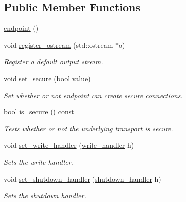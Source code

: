 \subsection*{Public Member Functions}
\begin{DoxyCompactItemize}
\item 
\hyperlink{classwebsocketpp_1_1transport_1_1iostream_1_1endpoint_a411c3b6ac387cef649e0925a7747c9d3}{endpoint} ()
\item 
void \hyperlink{classwebsocketpp_1_1transport_1_1iostream_1_1endpoint_ad6db3b10406e568befba8e00ae8b6ac4}{register\+\_\+ostream} (std\+::ostream $\ast$o)
\begin{DoxyCompactList}\small\item\em Register a default output stream. \end{DoxyCompactList}\item 
void \hyperlink{classwebsocketpp_1_1transport_1_1iostream_1_1endpoint_ae6488ca0ead1ce09a60e16a896162ad5}{set\+\_\+secure} (bool value)
\begin{DoxyCompactList}\small\item\em Set whether or not endpoint can create secure connections. \end{DoxyCompactList}\item 
bool \hyperlink{classwebsocketpp_1_1transport_1_1iostream_1_1endpoint_a9011b0a3f9d551304afa75e3b1e944c2}{is\+\_\+secure} () const 
\begin{DoxyCompactList}\small\item\em Tests whether or not the underlying transport is secure. \end{DoxyCompactList}\item 
void \hyperlink{classwebsocketpp_1_1transport_1_1iostream_1_1endpoint_a1db266dab8c73f4aa2e8a3bdb95ec5a3}{set\+\_\+write\+\_\+handler} (\hyperlink{namespacewebsocketpp_1_1transport_1_1iostream_abc22b834c2d0c698d6c87e51d5bfad2c}{write\+\_\+handler} h)
\begin{DoxyCompactList}\small\item\em Sets the write handler. \end{DoxyCompactList}\item 
void \hyperlink{classwebsocketpp_1_1transport_1_1iostream_1_1endpoint_a2ba3290fe7688190c2e85143f52d88cc}{set\+\_\+shutdown\+\_\+handler} (\hyperlink{namespacewebsocketpp_1_1transport_1_1iostream_a3563ce2cca06b1466f7d76ecb8eb4a0b}{shutdown\+\_\+handler} h)
\begin{DoxyCompactList}\small\item\em Sets the shutdown handler. \end{DoxyCompactList}\end{DoxyCompactItemize}
